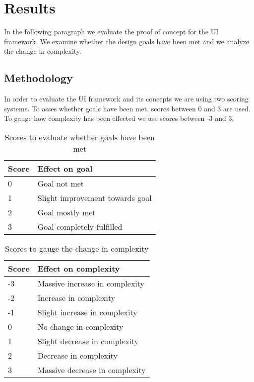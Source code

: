 \section{Results}
In the following paragraph we evaluate the proof of concept for the UI framework. We examine whether the design goals have been met and we analyze the change in complexity.

\subsection{Methodology}
In order to evaluate the UI framework and its concepts we are using two scoring systems. To asses whether goals have been met, scores between 0 and 3 are used. To gauge how complexity has been effected we use scores between -3 and 3.

\begin{table}[!htb]
  \begin{center}
    \begin{tabular}{|l|l|}
      \hline
      \textbf{Score} & \textbf{Effect on goal} \\
      \hline
      0 & Goal not met \\
      \hline
      1 & Slight improvement towards goal \\
      \hline
      2 & Goal mostly met \\
      \hline
      3 & Goal completely fulfilled \\
      \hline
    \end{tabular}
    \caption{Scores to evaluate whether goals have been met}
  \end{center}
\end{table}

\begin{table}[!htb]
  \begin{center}
    \begin{tabular}{|l|l|}
      \hline
      \textbf{Score} & \textbf{Effect on complexity} \\
      \hline
      -3 & Massive increase in complexity \\
      \hline
      -2 & Increase in complexity \\
      \hline
      -1 & Slight increase in complexity \\
      \hline
      0 & No change in complexity \\
      \hline
      1 & Slight decrease in complexity \\
      \hline
      2 & Decrease in complexity \\
      \hline
      3 & Massive decrease in complexity \\
      \hline
    \end{tabular}
    \caption{Scores to gauge the change in complexity}
  \end{center}
\end{table}

